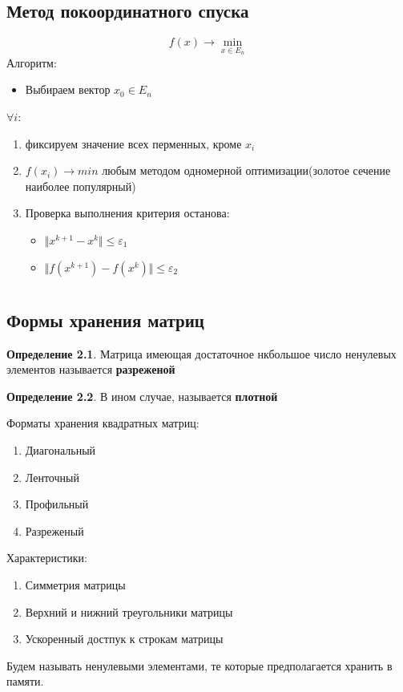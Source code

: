 \documentclass[oneside]{book}
\theoremstyle{plain}
\theoremstyle{remark}
\theoremstyle{definition}
\newtheorem*{definition}{Определение}
\begin{document}
\section{Метод покоординатного спуска}
\label{sec:org924ec6b}
\[ f(x) \to \min_{x \in E_n} \]
Алгоритм:
\begin{itemize}
\item Выбираем вектор \(x_0 \in E_n\) \\
\end{itemize}
\(\forall i:\)
\begin{enumerate}
\item фиксируем значение всех перменных, кроме \(x_i\)
\item \(f(x_i) \to min\) любым методом одномерной оптимизации(золотое сечение наиболее популярный)
\item Проверка выполнения критерия останова:
\begin{itemize}
\item \(\Vert x^{k + 1} - x^{k} \Vert \le \varepsilon_1\)
\item \(\Vert f(x^{k + 1}) - f(x^k) \Vert \le \varepsilon_2\)
\end{itemize}
\end{enumerate}
\chapter{}
\label{sec:orge340820}
\section{Формы хранения матриц}
\label{sec:org73fd420}
\begin{definition}
Матрица имеющая достаточное нкбольшое число ненулевых элементов называется \textbf{разреженой}
\end{definition}
\begin{definition}
В ином случае, называется \textbf{плотной}
\end{definition}
Форматы хранения квадратных матриц:
\begin{enumerate}
\item Диагональный
\item Ленточный
\item Профильный
\item Разреженый
\end{enumerate}
Характеристики:
\begin{enumerate}
\item Симметрия матрицы
\item Верхний и нижний треугольники матрицы
\item Ускоренный достпук к строкам матрицы
\end{enumerate}
Будем называть ненулевыми элементами, те которые предполагается хранить в памяти.
\end{document}
